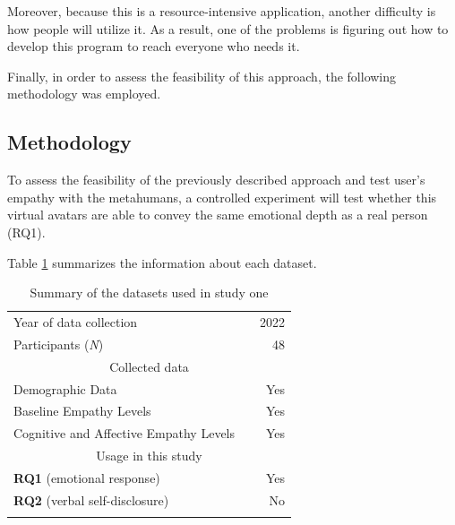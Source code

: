 Moreover, because this is a resource-intensive application, another difficulty is how people will utilize it. As a result, one of the problems is figuring out how to develop this program to reach everyone who needs it. 

Finally, in order to assess the feasibility of this approach, the following methodology was employed.

\subsection{Methodology}
To assess the feasibility of the previously described approach and test user's empathy with the metahumans, a controlled experiment will test whether this virtual avatars are able to convey the same emotional depth as a real person (RQ1).


Table \ref{tab:dataset} summarizes the information about each dataset.

\begin{table}[!htb]
    \centering
	\begin{tabular*}{0.8\linewidth}{ @{\extracolsep{\fill}} lcr}
		\toprule
		\small Year of data collection  & \small & \small 2022\\
        \small Participants (\textit{N})  & \small & \small 48\\
		\midrule
		
        \multicolumn{3}{c}{Collected data}\\
		\small Demographic Data  & \small & \small Yes\\
        \small Baseline Empathy Levels  & \small & \small Yes\\
        \small Cognitive and Affective Empathy Levels  & \small & \small Yes\\
        \midrule
		
        \multicolumn{3}{c}{Usage in this study}\\
        \small\textbf{RQ1} (emotional response)  & \small & \small Yes\\
        \small\textbf{RQ2} (verbal self-disclosure)  & \small & \small No\\
		
		\bottomrule\\
	\end{tabular*}
	\caption{Summary of the datasets used in study one}
	\label{tab:dataset}
\end{table}

